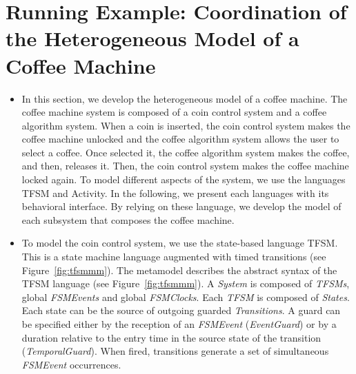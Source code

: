 \section{Running Example: Coordination of the Heterogeneous Model of a Coffee Machine}
\label{sec:runningexample}
\begin{itemize}
	\item In this section, we develop the heterogeneous model of a coffee machine. The coffee machine system is composed of a coin control system and a coffee algorithm system. When a coin is inserted, the coin control system makes the coffee machine unlocked and the coffee algorithm system allows the user to select a coffee. Once selected it, the coffee algorithm system makes the coffee, and then, releases it. Then, the coin control system makes the coffee machine locked again. To model different aspects of the system, we use the languages TFSM and Activity. In the following, we present each languages with its behavioral interface. By relying on these language, we develop the model of each subsystem that composes the coffee machine.  
	
	\item To model the coin control system, we use the state-based language TFSM. This is a state machine language augmented with timed transitions (see Figure~\ref{fig:tfsmmm}). The metamodel describes the abstract syntax of the TFSM language (see Figure~\ref{fig:tfsmmm}). A \emph{System} is composed of \emph{TFSMs}, global \emph{FSMEvents} and global \emph{FSMClocks}. Each \emph{TFSM} is composed of \emph{States}. Each state can be the source of outgoing guarded \emph{Transitions}. A guard can be specified either by the reception of an \emph{FSMEvent} (\emph{EventGuard}) or by a duration relative to the entry time in the source state of the transition (\emph{TemporalGuard}). When fired, transitions generate a set of simultaneous \emph{FSMEvent} occurrences.
	

\end{itemize}
